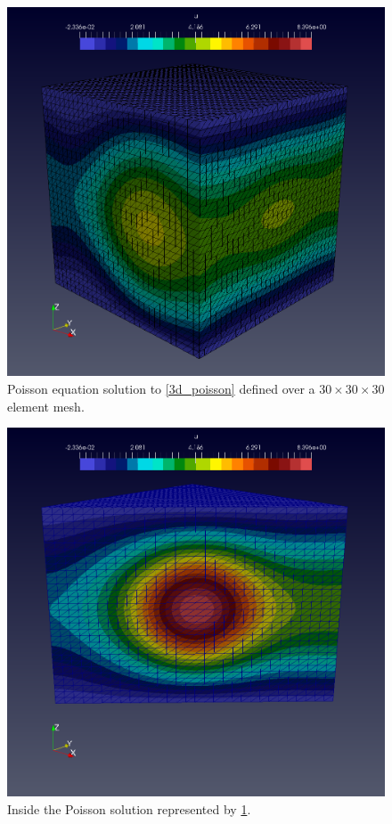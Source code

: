 \begin{figure}
  \centering
    \includegraphics[width=\linewidth]{images/fenics_intro/3Dpoisson_new.png}
  \caption[Three-dimensional Poisson solution]{Poisson equation solution to \cref{3d_poisson} defined over a $30 \times 30 \times 30$ element mesh.}
  \label{3d_poisson_image_1}
\end{figure}

\begin{figure}
  \centering
    \includegraphics[width=\linewidth]{images/fenics_intro/3Dpoisson_new_split.png}
  \caption[Inside the three-dimensional Poisson solution]{Inside the Poisson solution represented by \cref{3d_poisson_image_1}.}
  \label{3d_poisson_image_2}
\end{figure}

